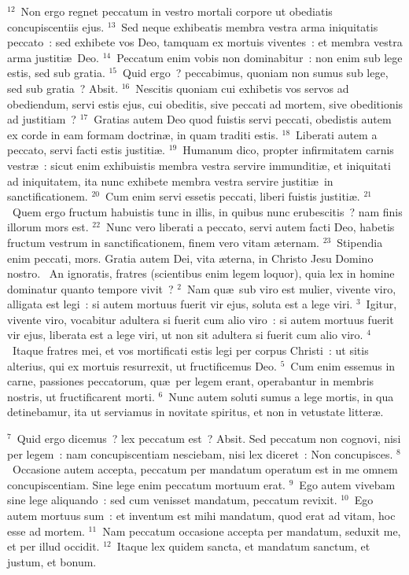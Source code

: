 ${}^{12}$~Non ergo regnet peccatum in vestro mortali corpore ut obediatis concupiscentiis ejus.
${}^{13}$~Sed neque exhibeatis membra vestra arma iniquitatis peccato~: sed exhibete vos Deo, tamquam ex mortuis viventes~: et membra vestra arma justiti\ae\ Deo.
${}^{14}$~Peccatum enim vobis non dominabitur~: non enim sub lege estis, sed sub gratia.
${}^{15}$~Quid ergo~? peccabimus, quoniam non sumus sub lege, sed sub gratia~? Absit.
${}^{16}$~Nescitis quoniam cui exhibetis vos servos ad obediendum, servi estis ejus, cui obeditis, sive peccati ad mortem, sive obeditionis ad justitiam~?
${}^{17}$~Gratias autem Deo quod fuistis servi peccati, obedistis autem ex corde in eam formam doctrin\ae , in quam traditi estis.
${}^{18}$~Liberati autem a peccato, servi facti estis justiti\ae .
${}^{19}$~Humanum dico, propter infirmitatem carnis vestr\ae~: sicut enim exhibuistis membra vestra servire immunditi\ae , et iniquitati ad iniquitatem, ita nunc exhibete membra vestra servire justiti\ae\ in sanctificationem.
${}^{20}$~Cum enim servi essetis peccati, liberi fuistis justiti\ae .
${}^{21}$~Quem ergo fructum habuistis tunc in illis, in quibus nunc erubescitis~? nam finis illorum mors est.
${}^{22}$~Nunc vero liberati a peccato, servi autem facti Deo, habetis fructum vestrum in sanctificationem, finem vero vitam \ae ternam.
${}^{23}$~Stipendia enim peccati, mors. Gratia autem Dei, vita \ae terna, in Christo Jesu Domino nostro.
~An ignoratis, fratres (scientibus enim legem loquor), quia lex in homine dominatur quanto tempore vivit~?
${}^{2}$~Nam qu\ae\ sub viro est mulier, vivente viro, alligata est legi~: si autem mortuus fuerit vir ejus, soluta est a lege viri.
${}^{3}$~Igitur, vivente viro, vocabitur adultera si fuerit cum alio viro~: si autem mortuus fuerit vir ejus, liberata est a lege viri, ut non sit adultera si fuerit cum alio viro.
${}^{4}$~Itaque fratres mei, et vos mortificati estis legi per corpus Christi~: ut sitis alterius, qui ex mortuis resurrexit, ut fructificemus Deo.
${}^{5}$~Cum enim essemus in carne, passiones peccatorum, qu\ae\ per legem erant, operabantur in membris nostris, ut fructificarent morti.
${}^{6}$~Nunc autem soluti sumus a lege mortis, in qua detinebamur, ita ut serviamus in novitate spiritus, et non in vetustate litter\ae .


${}^{7}$~Quid ergo dicemus~? lex peccatum est~? Absit. Sed peccatum non cognovi, nisi per legem~: nam concupiscentiam nesciebam, nisi lex diceret~: Non concupisces.
${}^{8}$~Occasione autem accepta, peccatum per mandatum operatum est in me omnem concupiscentiam. Sine lege enim peccatum mortuum erat.
${}^{9}$~Ego autem vivebam sine lege aliquando~: sed cum venisset mandatum, peccatum revixit.
${}^{10}$~Ego autem mortuus sum~: et inventum est mihi mandatum, quod erat ad vitam, hoc esse ad mortem.
${}^{11}$~Nam peccatum occasione accepta per mandatum, seduxit me, et per illud occidit.
${}^{12}$~Itaque lex quidem sancta, et mandatum sanctum, et justum, et bonum.


